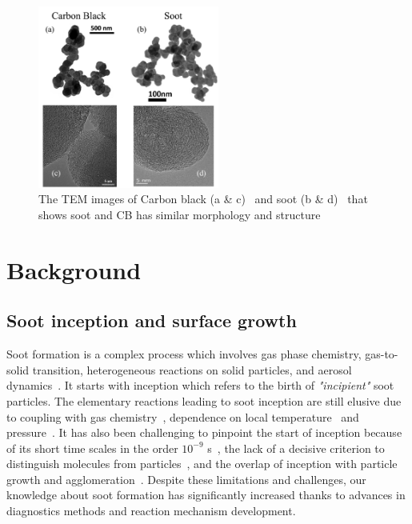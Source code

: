 \begin{figure}[!htbp]
	\centering
	\includegraphics[height=60mm, ]{Figures/Introduction/soot_CB_HRTEM.jpg}
	\caption{The TEM images of Carbon black (a \& c)~\citep{singh2018nanostructure} and soot (b \& d)~\citep{vander2007hrtem, lapuerta2017morphological}
	\label{fig:sootCBHRTEM} that shows soot and CB has similar morphology and structure}
\end{figure} 



\section{Background}
\subsection{Soot inception and surface growth}
Soot formation is a complex process which involves gas phase chemistry, gas-to-solid transition, heterogeneous reactions on solid particles, and aerosol dynamics~\citep{d2009combustion}. It starts with inception which refers to the birth of \textit{"incipient"} soot particles. The elementary reactions leading to soot inception are still elusive due to coupling with gas chemistry~\cite{Wang2011}, dependence on local temperature~\citep{gleason2018effect} and pressure~\cite{gleason2021pahs}. It has also been challenging to pinpoint the start of inception because of its short time scales in the order $10^{-9}$ s~\citep{buesser2012design}, the lack of a decisive criterion to distinguish molecules from particles~\citep{d2009combustion}, and the overlap of inception with particle growth and agglomeration~\cite{martin2022soot}. Despite these limitations and challenges, our knowledge about soot formation has significantly increased thanks to advances in diagnostics methods and reaction mechanism development. 

